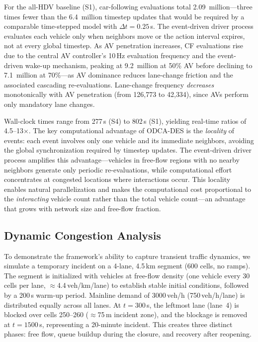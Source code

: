 \documentclass[review,authoryear]{elsarticle}
\begin{document}
For the all-HDV baseline (S1), car-following evaluations total 2.09~million---three times fewer than the 6.4~million timestep updates that would be required by a comparable time-stepped model with $\Delta t = 0.25$\,s. The event-driven driver process evaluates each vehicle only when neighbors move or the action interval expires, not at every global timestep. As AV penetration increases, CF evaluations rise due to the central AV controller's 10\,Hz evaluation frequency and the event-driven wake-up mechanism, peaking at 9.2~million at 50\% AV before declining to 7.1~million at 70\%---as AV dominance reduces lane-change friction and the associated cascading re-evaluations. Lane-change frequency \emph{decreases} monotonically with AV penetration (from 126{,}773 to 42{,}334), since AVs perform only mandatory lane changes.

Wall-clock times range from 277\,s (S4) to 802\,s (S1), yielding real-time ratios of 4.5--13$\times$. The key computational advantage of ODCA-DES is the \emph{locality} of events: each event involves only one vehicle and its immediate neighbors, avoiding the global synchronization required by timestep updates. The event-driven driver process amplifies this advantage---vehicles in free-flow regions with no nearby neighbors generate only periodic re-evaluations, while computational effort concentrates at congested locations where interactions occur. This locality enables natural parallelization and makes the computational cost proportional to the \emph{interacting} vehicle count rather than the total vehicle count---an advantage that grows with network size and free-flow fraction.


\subsection{Dynamic Congestion Analysis}
\label{sec:exp_incident}

To demonstrate the framework's ability to capture transient traffic dynamics, we simulate a temporary incident on a 4-lane, 4.5\,km segment (600 cells, no ramps). The segment is initialized with vehicles at free-flow density (one vehicle every 30 cells per lane, $\approx$4.4\,veh/km/lane) to establish stable initial conditions, followed by a 200\,s warm-up period. Mainline demand of 3000\,veh/h (750\,veh/h/lane) is distributed equally across all lanes. At $t = 300$\,s, the leftmost lane (lane~4) is blocked over cells 250--260 ($\approx$75\,m incident zone), and the blockage is removed at $t = 1500$\,s, representing a 20-minute incident. This creates three distinct phases: free flow, queue buildup during the closure, and recovery after reopening.
\end{document}
